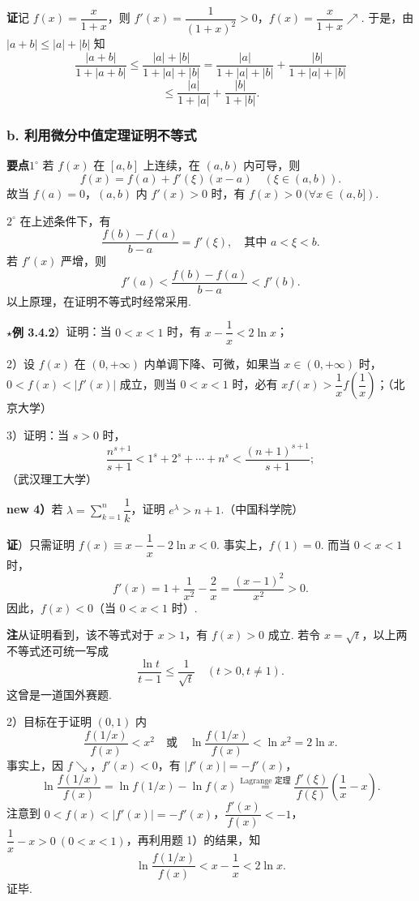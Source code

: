 \documentclass[UTF8,12pt,a4paper,fontset=fandol]{ctexart}
\begin{document}
\noindent\textbf{证}\quad 记 $f(x)=\dfrac{x}{1+x}$，则 $f'(x)=\dfrac1{(1+x)^2}>0$，$f(x)=\dfrac{x}{1+x}\nearrow$. 于是，由 $|a+b|\le |a|+|b|$ 知
\[
  \frac{|a+b|}{1+|a+b|}\le\frac{|a|+|b|}{1+|a|+|b|}
  =\frac{|a|}{1+|a|+|b|}+\frac{|b|}{1+|a|+|b|}
\]
\[
  \le \frac{|a|}{1+|a|}+\frac{|b|}{1+|b|}.
\]

\subsubsection*{b. 利用微分中值定理证明不等式}

\noindent\textbf{要点}\quad $1^\circ$ 若 $f(x)$ 在 $[a,b]$ 上连续，在 $(a,b)$ 内可导，则
\[
  f(x)=f(a)+f'(\xi)(x-a)\quad(\xi\in(a,b)).
\]
故当 $f(a)=0$，$(a,b)$ 内 $f'(x)>0$ 时，有 $f(x)>0\ (\forall x\in(a,b])$.

$2^\circ$ 在上述条件下，有
\[
  \frac{f(b)-f(a)}{b-a}=f'(\xi),\quad \text{其中 }a<\xi<b.
\]
若 $f'(x)$ 严增，则
\[
  f'(a)<\frac{f(b)-f(a)}{b-a}<f'(b).
\]
以上原理，在证明不等式时经常采用.

\noindent\textbf{$\star$例 3.4.2}）证明：当 $0<x<1$ 时，有 $x-\dfrac1x<2\ln x$；

2）设 $f(x)$ 在 $(0,+\infty)$ 内单调下降、可微，如果当 $x\in(0,+\infty)$ 时，$0<f(x)<|f'(x)|$ 成立，则当 $0<x<1$ 时，必有 $xf(x)>\dfrac1x f\left(\dfrac1x\right)$；（北京大学）

3）证明：当 $s>0$ 时，
\[
  \frac{n^{s+1}}{s+1}<1^s+2^s+\cdots+n^s<\frac{(n+1)^{s+1}}{s+1};
\]
（武汉理工大学）

\noindent\textbf{new 4）}\quad 若 $\lambda=\sum\limits_{k=1}^n\dfrac1k$，证明 $e^\lambda>n+1$.（中国科学院）

\noindent\textbf{证}）只需证明 $f(x)\equiv x-\dfrac1x-2\ln x<0$. 事实上，$f(1)=0$. 而当 $0<x<1$ 时，
\[
  f'(x)=1+\frac1{x^2}-\frac2x=\frac{(x-1)^2}{x^2}>0.
\]
因此，$f(x)<0$（当 $0<x<1$ 时）.

\noindent\textbf{注}\quad 从证明看到，该不等式对于 $x>1$，有 $f(x)>0$ 成立. 若令 $x=\sqrt t$，以上两不等式还可统一写成
\[
  \frac{\ln t}{t-1}\le \frac1{\sqrt t}\quad(t>0,t\ne1).
\]
这曾是一道国外赛题.

2）目标在于证明 $(0,1)$ 内
\[
  \frac{f(1/x)}{f(x)}<x^2\quad\text{或}\quad
  \ln\frac{f(1/x)}{f(x)}<\ln x^2=2\ln x.
\]
事实上，因 $f\searrow$，$f'(x)<0$，有 $|f'(x)|=-f'(x)$，
\[
  \ln\frac{f(1/x)}{f(x)}
  =\ln f(1/x)-\ln f(x)
  \overset{\text{Lagrange 定理}}{=}
  \frac{f'(\xi)}{f(\xi)}\left(\frac1x-x\right).
\]
注意到 $0<f(x)<|f'(x)|=-f'(x)$，$\dfrac{f'(x)}{f(x)}<-1$，$\dfrac1x-x>0\ (0<x<1)$，再利用题 1）的结果，知
\[
  \ln\frac{f(1/x)}{f(x)}<x-\frac1x<2\ln x.
\]
证毕.
\end{document}

